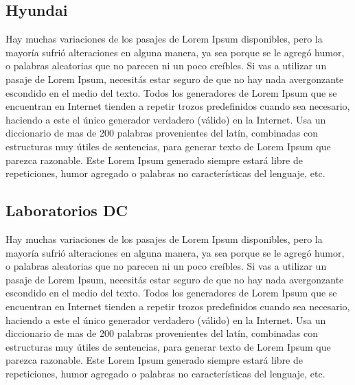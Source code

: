 \documentclass[final,narroweqnarray,inline]{ieee}
\begin{document}
  \subsection{Hyundai}

Hay muchas variaciones de los pasajes de Lorem Ipsum disponibles, pero la mayoría sufrió alteraciones en alguna manera, ya sea porque se le agregó humor, o palabras aleatorias que no parecen ni un poco creíbles. Si vas a utilizar un pasaje de Lorem Ipsum, necesitás estar seguro de que no hay nada avergonzante escondido en el medio del texto. Todos los generadores de Lorem Ipsum que se encuentran en Internet tienden a repetir trozos predefinidos cuando sea necesario, haciendo a este el único generador verdadero (válido) en la Internet. Usa un diccionario de mas de 200 palabras provenientes del latín, combinadas con estructuras muy útiles de sentencias, para generar texto de Lorem Ipsum que parezca razonable. Este Lorem Ipsum generado siempre estará libre de repeticiones, humor agregado o palabras no características del lenguaje, etc.

  \subsection{Laboratorios DC}

Hay muchas variaciones de los pasajes de Lorem Ipsum disponibles, pero la mayoría sufrió alteraciones en alguna manera, ya sea porque se le agregó humor, o palabras aleatorias que no parecen ni un poco creíbles. Si vas a utilizar un pasaje de Lorem Ipsum, necesitás estar seguro de que no hay nada avergonzante escondido en el medio del texto. Todos los generadores de Lorem Ipsum que se encuentran en Internet tienden a repetir trozos predefinidos cuando sea necesario, haciendo a este el único generador verdadero (válido) en la Internet. Usa un diccionario de mas de 200 palabras provenientes del latín, combinadas con estructuras muy útiles de sentencias, para generar texto de Lorem Ipsum que parezca razonable. Este Lorem Ipsum generado siempre estará libre de repeticiones, humor agregado o palabras no características del lenguaje, etc.

\end{document}
